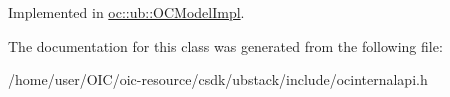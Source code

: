 Implemented in \hyperlink{classoc_1_1ub_1_1OCModelImpl_a7c6ce055a165c371b1d193464510d94b}{oc\+::ub\+::\+O\+C\+Model\+Impl}.



The documentation for this class was generated from the following file\+:\begin{DoxyCompactItemize}
\item 
/home/user/\+O\+I\+C/oic-\/resource/csdk/ubstack/include/ocinternalapi.\+h\end{DoxyCompactItemize}
